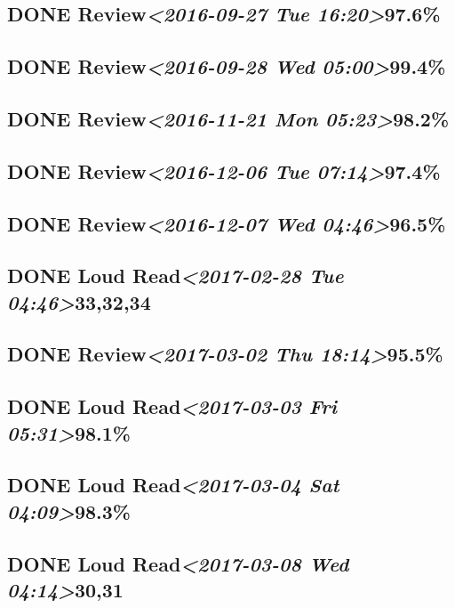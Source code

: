 \documentclass[11pt]{ctexart}
\begin{document}
\subsection{{\bfseries\sffamily DONE} Review\textit{<2016-09-27 Tue 16:20>}97.6\%}
\label{sec:org7b3fff8}
\subsection{{\bfseries\sffamily DONE} Review\textit{<2016-09-28 Wed 05:00>}99.4\%}
\label{sec:orgbefa73f}
\subsection{{\bfseries\sffamily DONE} Review\textit{<2016-11-21 Mon 05:23>}98.2\%}
\label{sec:org1a53474}
\subsection{{\bfseries\sffamily DONE} Review\textit{<2016-12-06 Tue 07:14>}97.4\%}
\label{sec:org7f69f29}
\subsection{{\bfseries\sffamily DONE} Review\textit{<2016-12-07 Wed 04:46>}96.5\%}
\label{sec:orgf1e8d21}
\subsection{{\bfseries\sffamily DONE} Loud Read\textit{<2017-02-28 Tue 04:46>}33,32,34}
\label{sec:org7875056}
\subsection{{\bfseries\sffamily DONE} Review\textit{<2017-03-02 Thu 18:14>}95.5\%}
\label{sec:orgaca14ee}
\subsection{{\bfseries\sffamily DONE} Loud Read\textit{<2017-03-03 Fri 05:31>}98.1\%}
\label{sec:org94014cd}
\subsection{{\bfseries\sffamily DONE} Loud Read\textit{<2017-03-04 Sat 04:09>}98.3\%}
\label{sec:org5a77b20}
\subsection{{\bfseries\sffamily DONE} Loud Read\textit{<2017-03-08 Wed 04:14>}30,31}
\label{sec:orgd583726}
\end{document}
